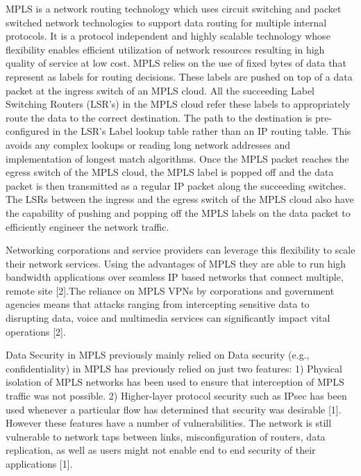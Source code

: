 \documentclass[a4paper, 12pt, oneside]{report}         %
\begin{document}
\begin{thesissummary}                           %

MPLS is a network routing technology which uses circuit switching and packet switched network technologies to support data routing for multiple internal protocols. It is a protocol independent and highly scalable technology whose flexibility enables efficient utilization of network resources resulting in high quality of service at low cost. MPLS relies on the use of fixed bytes of data that represent as labels for routing decisions. These labels are pushed on top of a data packet at the ingress switch of an MPLS cloud. All the succeeding Label Switching Routers (LSR's) in the MPLS cloud refer these labels to appropriately route the data to the correct destination. The path to the destination is pre-configured in the LSR's Label lookup table rather than an IP routing table. This avoids any complex lookups or reading long network addresses and implementation of longest match algorithms. Once the MPLS packet reaches the egress switch of the MPLS cloud, the MPLS label is popped off and the data packet is then transmitted as a regular IP packet along the succeeding switches. The LSRs between the ingress and the egress switch of the MPLS cloud also have the capability of pushing and popping off the MPLS labels on the data packet to efficiently engineer the network traffic.

	Networking corporations and service providers can leverage this flexibility to scale their network services. Using the advantages of MPLS they are able to run high bandwidth applications over seamless IP based networks that connect multiple,
remote site [2].The reliance on MPLS VPNs by corporations and government agencies means that attacks ranging from intercepting sensitive data to disrupting data, voice and multimedia services can significantly impact vital operations [2].

	Data Security in MPLS previously mainly relied on  Data security (e.g., confidentiality) in MPLS has previously relied on just two features: 1) Physical isolation of MPLS networks has been used to ensure that interception of MPLS traffic was not possible. 2) Higher-layer protocol security such as IPsec has been used whenever a particular flow has determined that security was desirable [1]. However these features have a number of vulnerabilities. The network is still vulnerable to network taps between links, misconfiguration of routers, data replication, as well as users might not enable end to end security of their applications [1].
    

\end{thesissummary}
\end{document}
